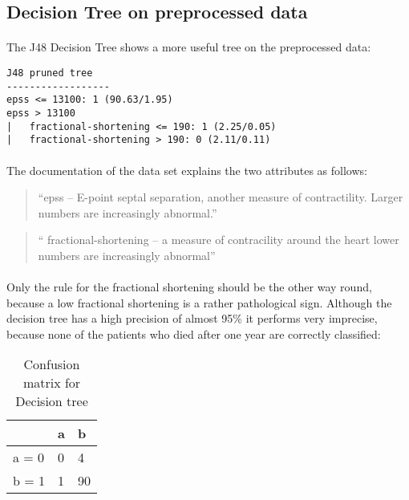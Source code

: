 \documentclass[paper=a4, fontsize=11pt]{scrartcl} %
\numberwithin{equation}{section} %
\numberwithin{figure}{section} %
\numberwithin{table}{section} %
\begin{document}
\subsection{Decision Tree on preprocessed data}

\paragraph{}The J48 Decision Tree shows a more useful tree on the preprocessed data:

\begin{lstlisting}
J48 pruned tree
------------------
epss <= 13100: 1 (90.63/1.95)
epss > 13100
|   fractional-shortening <= 190: 1 (2.25/0.05)
|   fractional-shortening > 190: 0 (2.11/0.11)
\end{lstlisting}

\paragraph{}The documentation of the data set explains the two attributes as follows:

\begin{quote}
``epss -- E-point septal separation, another measure of contractility. Larger numbers are increasingly abnormal.''
\end{quote}

\begin{quote}
`` fractional-shortening -- a measure of contracility around the heart lower numbers are increasingly abnormal''
\end{quote}

\paragraph{}Only the rule for the fractional shortening should be the other way round, because a low fractional shortening is a rather pathological sign. Although the decision tree has a high precision of almost 95\% it performs very imprecise, because none of the patients who died after one year are correctly classified:

\begin{table}[h]
\centering
\begin{tabular}{|l|ll|}
\hline
 & a &	b \\
\hline
a = 0  & 0 & 4 	\\
b = 1 & 1 & 90 	\\
\hline
\end{tabular}
\caption{Confusion matrix for Decision tree}
\end{table}
\end{document}
